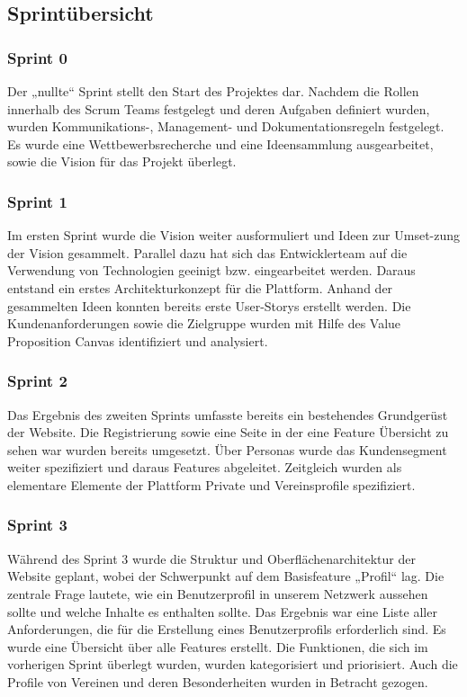 
\subsection{Sprintübersicht}

\subsubsection{Sprint 0}
Der „nullte“ Sprint stellt den Start des Projektes dar. Nachdem die Rollen innerhalb des Scrum Teams festgelegt und deren Aufgaben definiert wurden, wurden Kommunikations-, Management- und Dokumentationsregeln festgelegt. Es wurde eine Wettbewerbsrecherche und eine Ideensammlung ausgearbeitet, sowie die Vision für das Projekt überlegt.

\subsubsection{Sprint 1}
Im ersten Sprint wurde die Vision weiter ausformuliert und Ideen zur Umset-zung der Vision gesammelt. Parallel dazu hat sich das Entwicklerteam auf die Verwendung von Technologien geeinigt bzw. eingearbeitet werden. Daraus entstand ein erstes Architekturkonzept für die Plattform. Anhand der gesammelten Ideen konnten bereits erste User-Storys erstellt werden. Die Kundenanforderungen sowie die Zielgruppe wurden mit Hilfe des Value Proposition Canvas identifiziert und analysiert.

\subsubsection{Sprint 2}
Das Ergebnis des zweiten Sprints umfasste bereits ein bestehendes Grundgerüst der Website. Die Registrierung sowie eine Seite in der eine Feature Übersicht zu sehen war wurden bereits umgesetzt. Über Personas wurde das Kundensegment weiter spezifiziert und daraus Features abgeleitet. Zeitgleich wurden als elementare Elemente der Plattform Private und Vereinsprofile spezifiziert.

\subsubsection{Sprint 3}
Während des Sprint 3 wurde die Struktur und Oberflächenarchitektur der Website geplant, wobei der Schwerpunkt auf dem Basisfeature „Profil“ lag. Die zentrale Frage lautete, wie ein Benutzerprofil in unserem Netzwerk aussehen sollte und welche Inhalte es enthalten sollte. Das Ergebnis war eine Liste aller Anforderungen, die für die Erstellung eines Benutzerprofils erforderlich sind. Es wurde eine Übersicht über alle Features erstellt. Die Funktionen, die sich im vorherigen Sprint überlegt wurden, wurden kategorisiert und priorisiert. Auch die Profile von Vereinen und deren Besonderheiten wurden in Betracht gezogen.

